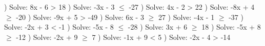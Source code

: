 \documentclass{article}%
\begin{document}
\newline%
\newline%
) Solve: 8x - 6 > 18%
\newline%
\newline%
) Solve: -3x - 3 $\leq$ -27%
\newline%
\newline%
) Solve: 4x - 2 > 22%
\newline%
\newline%
) Solve: -8x + 4 $\geq$ -20%
\newline%
\newline%
) Solve: -9x + 5 > -49%
\newline%
\newline%
) Solve: 6x - 3 $\geq$ 27%
\newline%
\newline%
) Solve: -4x - 1 $\geq$ -37%
\newline%
\newline%
) Solve: -2x + 3 < -1%
\newline%
\newline%
) Solve: -5x - 8 $\leq$ -28%
\newline%
\newline%
) Solve: 3x + 6 $\geq$ 18%
\newline%
\newline%
) Solve: -5x + 8 $\geq$ -12%
\newline%
\newline%
) Solve: -2x + 9 $\geq$ 7%
\newline%
\newline%
) Solve: -1x + 9 < 5%
\newline%
\newline%
) Solve: -2x - 4 > -14%
\newline%
\newline%
\newline%
\end{document}
